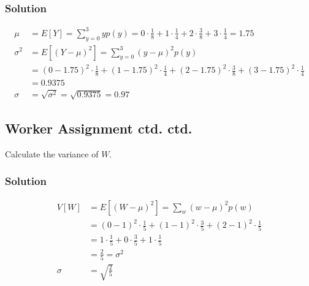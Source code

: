 \documentclass[11pt]{article}
\theoremstyle{definition}
\begin{document}
\subsubsection*{Solution}

$$
	\begin{aligned}
		\mu & = E[Y] = \sum_{y=0}^3 yp(y) = 0 \cdot \frac{1}{8} + 1 \cdot \frac{1}{4} + 2 \cdot \frac{3}{8} + 3 \cdot \frac{1}{4} = 1.75 \\
		\sigma^2 & = E[(Y-\mu)^2] = \sum_{y=0}^3 (y-\mu)^2p(y) \\
		& = (0 - 1.75)^2 \cdot \frac{1}{8} + (1 - 1.75)^2 \cdot \frac{1}{4} + (2 - 1.75)^2 \cdot \frac{3}{8} + (3 - 1.75)^2 \cdot \frac{1}{4} \\
		& = 0.9375 \\
		\sigma & = \sqrt{\sigma^2} = \sqrt{0.9375} = 0.97
	\end{aligned}
$$

\subsection{Worker Assignment ctd. ctd.}

Calculate the variance of $W$.

\subsubsection*{Solution}

$$
	\begin{aligned}
		V[W] & = E[(W - \mu)^2] = \sum_w (w-\mu)^2p(w) \\
		& = (0 - 1)^2 \cdot \frac{1}{5} + (1 - 1)^2 \cdot \frac{3}{5} + (2 - 1)^2 \cdot \frac{1}{5} \\
		& = 1 \cdot \frac{1}{5} + 0 \cdot \frac{3}{5} + 1 \cdot \frac{1}{5} \\
		& = \frac{2}{5} = \sigma^2 \\
		\sigma & = \sqrt{\frac{2}{5}}
	\end{aligned}
$$
\end{document}
